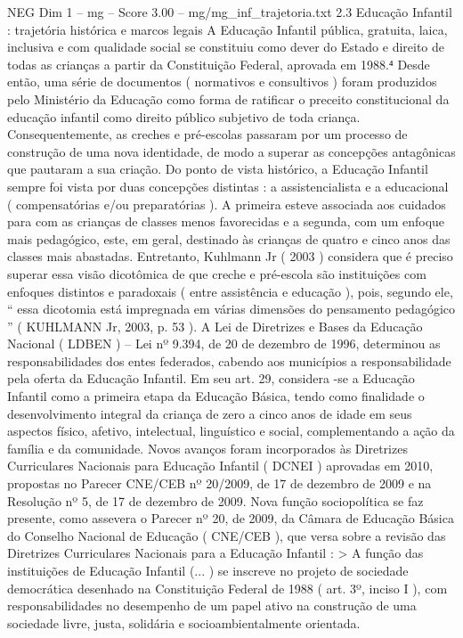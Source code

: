 \begin{textsample}{NEG Dim 1 – mg – Score 3.00 – mg/mg\_inf\_trajetoria.txt}  \label{ex:f1_neg_054}
2.3 Educação Infantil : trajetória histórica e marcos legais A Educação Infantil pública, gratuita, laica, inclusiva e com qualidade social se constituiu como dever do Estado e direito de todas as crianças a partir da Constituição Federal, aprovada em 1988.⁴ Desde então, uma série de documentos ( normativos e consultivos ) foram produzidos pelo Ministério da Educação como forma de ratificar o preceito constitucional da educação infantil como direito público subjetivo de toda criança.
Consequentemente, as creches e pré-escolas passaram por um processo de construção de uma nova identidade, de modo a superar as concepções antagônicas que pautaram a sua criação.
Do ponto de vista histórico, a Educação Infantil sempre foi vista por duas concepções distintas : a assistencialista e a educacional ( compensatórias e/ou preparatórias ).
A primeira esteve associada aos cuidados para com as crianças de classes menos favorecidas e a segunda, com um enfoque mais pedagógico, este, em geral, destinado às crianças de quatro e cinco anos das classes mais abastadas.
Entretanto, Kuhlmann Jr ( 2003 ) considera que é preciso superar essa visão dicotômica de que creche e pré-escola são instituições com enfoques distintos e paradoxais ( entre assistência e educação ), pois, segundo ele, “ essa dicotomia está impregnada em várias dimensões do pensamento pedagógico ” ( KUHLMANN Jr, 2003, p. 53 ).
A Lei de Diretrizes e Bases da Educação Nacional ( LDBEN ) – Lei nº 9.394, de 20 de dezembro de 1996, determinou as responsabilidades dos entes federados, cabendo aos municípios a responsabilidade pela oferta da Educação Infantil.
Em seu art. 29, considera -se a Educação Infantil como a primeira etapa da Educação Básica, tendo como finalidade o desenvolvimento integral da criança de zero a cinco anos de idade em seus aspectos físico, afetivo, intelectual, linguístico e social, complementando a ação da família e da comunidade.
Novos avanços foram incorporados às Diretrizes Curriculares Nacionais para Educação Infantil ( DCNEI ) aprovadas em 2010, propostas no Parecer CNE/CEB nº 20/2009, de 17 de dezembro de 2009 e na Resolução nº 5, de 17 de dezembro de 2009.
Nova função sociopolítica se faz presente, como assevera o Parecer nº 20, de 2009, da Câmara de Educação Básica do Conselho Nacional de Educação ( CNE/CEB ), que versa sobre a revisão das Diretrizes Curriculares Nacionais para a Educação Infantil : > A função das instituições de Educação Infantil (... ) se inscreve no projeto de sociedade democrática desenhado na Constituição Federal de 1988 ( art. 3º, inciso I ), com responsabilidades no desempenho de um papel ativo na construção de uma sociedade livre, justa, solidária e socioambientalmente orientada.

\end{textsample}
